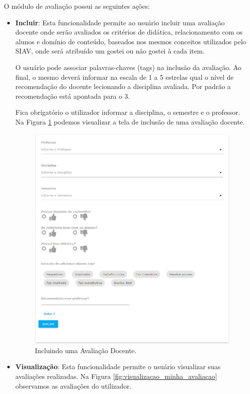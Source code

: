 \documentclass[12pt, a4paper]{report}
\begin{document}
O módulo de avaliação possui as seguintes ações:
\begin{itemize}
\item \textbf{Incluir}: Esta funcionalidade permite ao usuário incluir uma avaliação docente onde serão avaliados os critérios de didática, relacionamento com os alunos e domínio de conteúdo, baseados nos mesmos conceitos utilizados pelo SIAV, onde será atribuído um gostei ou não gostei à cada item.

O usuário pode associar palavras-chaves (tags) na inclusão da avaliação. Ao final, o mesmo deverá informar na escala de 1 a 5 estrelas qual o nível de recomendação do docente lecionando a disciplina avaliada. Por padrão a recomendação está apontada para o 3. 

Fica obrigatório o utilizador informar a disciplina, o semestre e o professor. Na Figura \ref{fig:incluir_avaliacao}  podemos visualizar a tela de inclusão de uma avaliação docente.

\begin{figure}
\centering
\includegraphics[scale=0.5]{incluir_avaliacao.png}
\caption{Incluindo uma Avaliação Docente.}
\label{fig:incluir_avaliacao}
\end{figure}

\item \textbf{Visualização}: Esta funcionalidade permite o usuário visualizar suas avaliações realizadas. Na Figura \ref{fig:visualizacao_minha_avaliacao} observamos as avaliações do utilizador.


\end{itemize}
\end{document}
